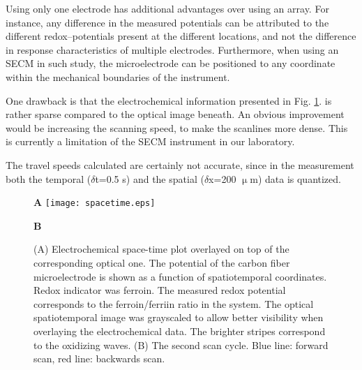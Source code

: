 \documentclass[3p]{elsarticle}
\begin{document}
Using only one electrode has additional advantages over using an array.
For instance, any difference in the measured potentials can be attributed to the different redox--potentials present at the different locations, and not the difference in response characteristics of multiple electrodes. 
Furthermore, when using an SECM in such study, the microelectrode can be positioned to any coordinate within the mechanical boundaries of the instrument.

One drawback is that the electrochemical information presented in Fig. \ref{fig:spatiotemporal}. is rather sparse compared to the optical image beneath.
An obvious improvement would be increasing the scanning speed, to make the scanlines more dense.
This is currently a limitation of the SECM instrument in our laboratory.

The travel speeds calculated are certainly not accurate, since in the measurement both the temporal ($\delta$t=0.5 s) and the spatial ($\delta$x=200 $\upmu$m) data is quantized.


\def\s{0.5}
\begin{figure}
\hspace{4cm} \textbf{\large{A}}
\texttt{[image: spacetime.eps]}
\vspace{1cm}

\hspace{4cm} \textbf{\large{B}}

\centering
{}
\caption{(A) Electrochemical space-time plot overlayed on top of the corresponding optical one.
The potential of the carbon fiber microelectrode is shown as a function of spatiotemporal coordinates.
Redox indicator was ferroin.
The measured redox potential corresponds to the ferroin/ferriin ratio in the system.
The optical spatiotemporal image was grayscaled to allow better visibility when overlaying the electrochemical data.
The brighter stripes correspond to the oxidizing waves.
(B) The second scan cycle.
Blue line: forward scan, red line: backwards scan.
}
\label{fig:spatiotemporal}
\end{figure}
\end{document}

